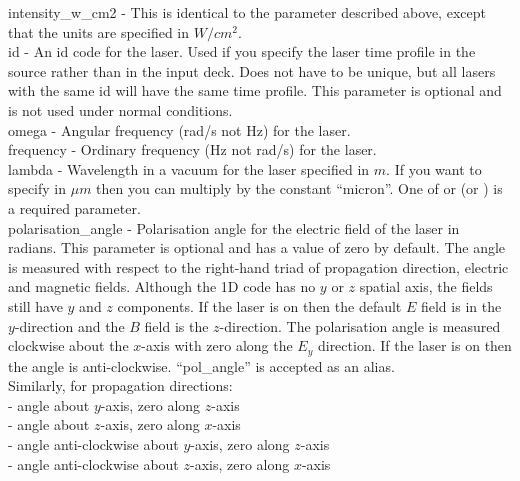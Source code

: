 {\emphtext intensity\_w\_cm2} - This is identical to the
   parameter described above, except that the units
  are specified in $W/cm^2$.\\

{\emphtext id} - An id code for the laser. Used if you specify the laser time
  profile in the {\EPOCH} source rather than in the input deck. Does not have to
  be unique, but all lasers with the same id will have the same time profile.
  This parameter is optional and is not used under normal conditions.\\

{\emphtext omega} - Angular frequency (rad/s not Hz) for the laser.\\

{\emphtext frequency} - Ordinary frequency (Hz not rad/s) for the laser.\\

{\emphtext lambda} - Wavelength in a vacuum for the laser specified in $m$.
  If you want to specify in $\mu m$ then you can multiply by the constant
  ``micron''. One of  or  (or
  ) is a required parameter.\\

{\emphtext polarisation\_angle} - Polarisation angle for the electric field of
  the laser in radians. This parameter is optional and has a value of zero by
  default. The angle is measured with respect to the right-hand triad of
  propagation direction, electric and magnetic fields. Although the 1D code
  has no $y$ or $z$ spatial axis, the fields still have $y$ and $z$ components.
  If the laser is on  then the default $E$ field is in the
  $y$-direction and the $B$ field is the $z$-direction. The polarisation angle
  is measured clockwise about the $x$-axis with zero along the $E_y$
  direction. If the laser is on  then the angle is
  anti-clockwise. ``pol\_angle'' is accepted as an alias.\\
  Similarly, for propagation directions:\\
 - angle about $y$-axis, zero along $z$-axis\\
 - angle about $z$-axis, zero along $x$-axis\\
 - angle anti-clockwise about $y$-axis, zero along $z$-axis\\
 - angle anti-clockwise about $z$-axis, zero along $x$-axis\\

